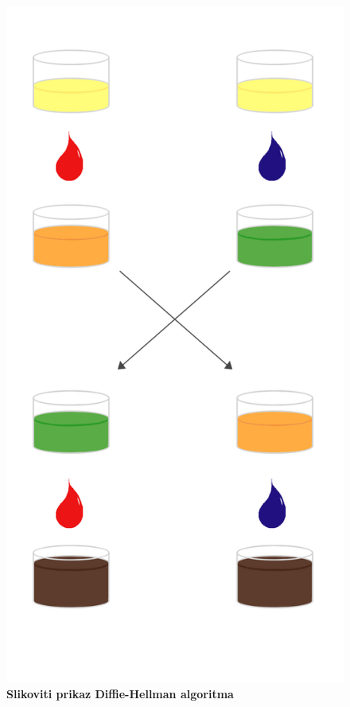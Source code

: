 \documentclass[a4paper]{article}
\begin{document}
\begin{figure}[h]
\centering
    \includegraphics[scale=0.5]{Boje.jpg}
\caption{\textbf{Slikoviti prikaz Diffie-Hellman algoritma}}
\label{slika:boje}
\end{figure}
\end{document}
